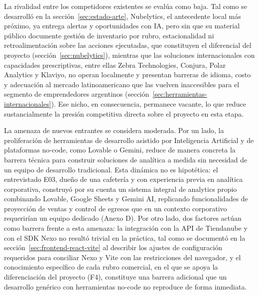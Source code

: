 La rivalidad entre los competidores existentes se evalúa como baja. Tal como se desarrolló en la sección~\ref{sec:estado-arte}, Nubelytics, el antecedente local más próximo, ya entrega alertas y oportunidades con IA, pero sin que su material público documente gestión de inventario por rubro, estacionalidad ni retroalimentación sobre las acciones ejecutadas, que constituyen el diferencial del proyecto (sección~\ref{sec:nubelytics}), mientras que las soluciones internacionales con capacidades prescriptivas, entre ellas Zebra Technologies, Conjura, Polar Analytics y Klaviyo, no operan localmente y presentan barreras de idioma, costo y adecuación al mercado latinoamericano que las vuelven inaccesibles para el segmento de emprendedores argentinos (sección~\ref{sec:herramientas-internacionales}). Ese nicho, en consecuencia, permanece vacante, lo que reduce sustancialmente la presión competitiva directa sobre el proyecto en esta etapa.

La amenaza de nuevos entrantes se considera moderada. Por un lado, la proliferación de herramientas de desarrollo asistido por Inteligencia Artificial y de plataformas no-code, como Lovable o Gemini, reduce de manera concreta la barrera técnica para construir soluciones de analítica a medida sin necesidad de un equipo de desarrollo tradicional. Esta dinámica no es hipotética: el entrevistado E03, dueño de una cafetería y con experiencia previa en analítica corporativa, construyó por su cuenta un sistema integral de analytics propio combinando Lovable, Google Sheets y Gemini AI, replicando funcionalidades de proyección de ventas y control de egresos que en un contexto corporativo requerirían un equipo dedicado (Anexo D). Por otro lado, dos factores actúan como barrera frente a esta amenaza: la integración con la API de Tiendanube y con el SDK Nexo no resultó trivial en la práctica, tal como se documentó en la sección~\ref{sec:frontend-react-vite} al describir los ajustes de configuración requeridos para conciliar Nexo y Vite con las restricciones del navegador, y el conocimiento específico de cada rubro comercial, en el que se apoya la diferenciación del proyecto (F4), constituye una barrera adicional que un desarrollo genérico con herramientas no-code no reproduce de forma inmediata.

